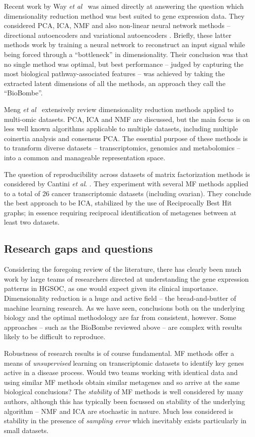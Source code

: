 \documentclass[draft,tikz, 12pt,a4paper,oneside,fleqn]{article}
\newcommand{\etal}{{\em et al\/}}
\begin{document}
Recent work by Way \etal\ \cite{WayGregory2019} was aimed directly at answering the question which dimensionality reduction method was best suited to gene expression data.  They considered PCA, ICA, NMF and also non-linear neural network methods -- directional autoencoders  and variational autoencoders .  Briefly, these latter methods work by training a neural network to reconstruct an input signal while being forced through a ``bottleneck'' in dimensionality.   Their conclusion was that no single method was optimal, but best performance -- judged by capturing the most biological pathway-associated features -- was achieved by taking the extracted latent dimensions of all the methods, an approach they call the ``BioBombe''.

Meng \etal\ \cite{Meng2016} extensively review dimensionality reduction methods applied to multi-omic datasets.   PCA, ICA and NMF are discussed, but the main focus is on less well known algorithms applicable to multiple datasets, including multiple coinertia analysis and consensus PCA.  The essential purpose of these methods is to transform diverse datasets -- transcriptomics, genomics and metabolomics  -- into a common and manageable representation space.

The question of reproducibility across datasets of matrix factorization methods is considered by Cantini \etal. \cite{Cantini2019}.  They experiment with several MF methods applied to a total of 26 cancer transcriptomic datasets (including ovarian).  They conclude the best approach to be ICA, stabilized by the use of Reciprocally Best Hit graphs; in essence requiring reciprocal identification of metagenes between at least two datasets.

\subsection{Research gaps and questions}
Considering the foregoing review of the literature, there has clearly been much work by large teams of researchers directed at understanding the gene expression patterns in HGSOC, as one would expect given its clinical importance.  
Dimensionality reduction is a huge and active field -- the bread-and-butter of machine learning research. 
As we have seen, conclusions both on the underlying biology and the optimal methodology are far from consistent, however.   Some approaches -- such as the BioBombe reviewed above -- are complex with results likely to be difficult to reproduce.   

Robustness of research results is of course fundamental.  MF methods offer a means of \emph{unsupervised} learning on transcriptomic datasets to identify key genes active in a disease process.  Would two teams working with identical data and using similar MF methods obtain similar metagenes and so arrive at the same biological conclusions?   The \emph{stability} of MF methods is well considered by many authors, although this has typically been focussed on stability of the underlying algorithm -- NMF and ICA are stochastic in nature.   Much less considered is stability in the presence of \emph{sampling error} which inevitably exists particularly in small datasets.
\end{document}
